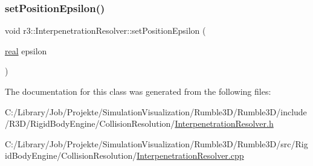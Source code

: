 \mbox{\label{classr3_1_1_interpenetration_resolver_ad70802061f5f8868622cc5024a10f8cf}} 
\subsubsection{\texorpdfstring{set\+Position\+Epsilon()}{setPositionEpsilon()}}
{\footnotesize\ttfamily void r3\+::\+Interpenetration\+Resolver\+::set\+Position\+Epsilon (\begin{DoxyParamCaption}\item[{\mbox{\hyperlink{namespacer3_ab2016b3e3f743fb735afce242f0dc1eb}{real}}}]{epsilon }\end{DoxyParamCaption})}



The documentation for this class was generated from the following files\+:\begin{DoxyCompactItemize}
\item 
C\+:/\+Library/\+Job/\+Projekte/\+Simulation\+Visualization/\+Rumble3\+D/\+Rumble3\+D/include/\+R3\+D/\+Rigid\+Body\+Engine/\+Collision\+Resolution/\mbox{\hyperlink{_interpenetration_resolver_8h}{Interpenetration\+Resolver.\+h}}\item 
C\+:/\+Library/\+Job/\+Projekte/\+Simulation\+Visualization/\+Rumble3\+D/\+Rumble3\+D/src/\+Rigid\+Body\+Engine/\+Collision\+Resolution/\mbox{\hyperlink{_interpenetration_resolver_8cpp}{Interpenetration\+Resolver.\+cpp}}\end{DoxyCompactItemize}
